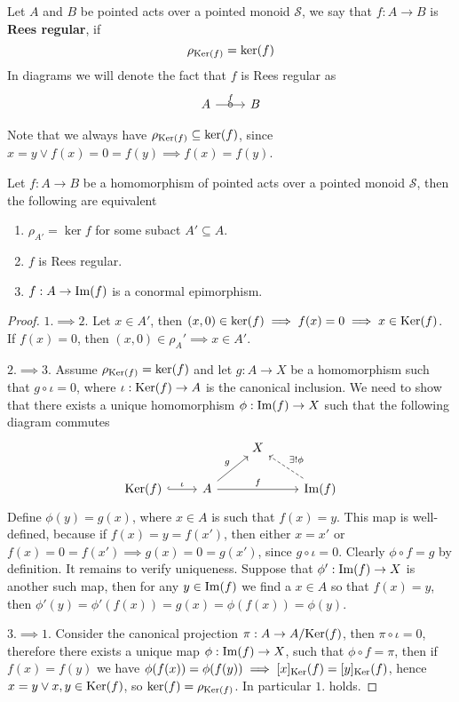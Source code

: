 \begin{definition}
    Let $A$ and $B$ be pointed acts over a pointed monoid $\mathcal{S}$, we say that 
    $f: A\to B$ is \textbf{Rees regular}, if 
    \[
        \rho_{\mathrm{Ker}(f)} = \mathrm{ker}(f)
    \]
    In diagrams we will denote the fact that $f$ is Rees regular as 
    \[\begin{tikzcd}
	A & B
	\arrow["f", "\circ"{marking}, from=1-1, to=1-2]
\end{tikzcd}\]
\end{definition}
\begin{remark}
    Note that we always have $\rho_{\mathrm{Ker}(f)}\subseteq\mathrm{ker}(f)$, since $x=y\lor f(x)=0=f(y)\implies f(x)=f(y)$.
\end{remark}
\begin{proposition}
    Let $f: A\to B$ be a homomorphism of pointed acts over a pointed monoid $\mathcal{S}$, then the following are equivalent
    \begin{enumerate}
        \item $\rho_{A'} = \ker{f}$ for some subact $A'\subseteq A$.
        \item $f$ is Rees regular.
        \item $f: A \to\mathrm{Im}(f)$ is a conormal epimorphism.
    \end{enumerate}
\end{proposition}
\begin{proof}
    $1.\implies 2.$ Let $x\in A'$, then $(x,0)\in\mathrm{ker}(f) \implies f(x)=0 \implies x \in\mathrm{Ker}(f)$. If $f(x)=0$, then 
    $(x,0)\in\rho_A' \implies x\in A'$. \par
    $2.\implies 3.$ Assume $\rho_{\mathrm{Ker}(f)} = \mathrm{ker}(f)$ and let $g: A\to X$ be a homomorphism such that $g\circ\iota = 0$, where
    $\iota: \mathrm{Ker}(f)\to A$ is the canonical inclusion. We need to show that there exists a unique homomorphism $\phi: \mathrm{Im}(f)\to X$ such that
    the following diagram commutes 
    \[\begin{tikzcd}
        && X \\
        {\Kernel{f}} & A && {\Image{f}}
        \arrow["\iota", hook, from=2-1, to=2-2]
        \arrow["g", from=2-2, to=1-3]
        \arrow["f", from=2-2, to=2-4]
        \arrow["{\exists ! \phi}"', dashed, from=2-4, to=1-3]
    \end{tikzcd}\]
    Define $\phi(y) = g(x)$, where $x\in A$ is such that $f(x)=y$. This map is well-defined, because if $f(x)=y=f(x')$, then
    either $x=x'$ or $f(x)=0=f(x') \implies g(x)=0=g(x')$, since $g\circ\iota = 0$. Clearly $\phi\circ f = g$ by definition.
    It remains to verify uniqueness. Suppose that $\phi': \mathrm{Im}(f)\to X$ is another such map, then for any $y\in\mathrm{Im}(f)$ we 
    find a $x\in A$ so that $f(x) = y$, then $\phi'(y) = \phi'(f(x)) = g(x) = \phi(f(x)) = \phi(y)$. \par
    $3. \implies 1.$ Consider the canonical projection $\pi : A \to A/\mathrm{Ker}(f)$, then $\pi\circ\iota = 0$, therefore 
    there exists a unique map $\phi: \mathrm{Im}(f)\to X$, such that $\phi\circ f = \pi$, then if $f(x)=f(y)$ we have 
    $\phi(f(x))=\phi(f(y)) \implies [x]_\mathrm{Ker}(f)=[y]_\mathrm{Ker}(f)$, hence $x=y \lor x,y\in\mathrm{Ker}(f)$, so 
    $\mathrm{ker}(f)=\rho_{\mathrm{Ker}(f)}$. In particular $1.$ holds.
\end{proof}
